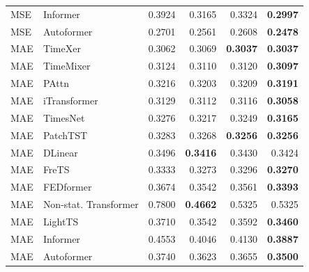\begin{longtable}{llrrrr}
MSE & Informer & 0.3924 & 0.3165 & 0.3324 & \textbf{0.2997} \\
MSE & Autoformer & 0.2701 & 0.2561 & 0.2608 & \textbf{0.2478} \\
\midrule
MAE & TimeXer & 0.3062 & 0.3069 & \textbf{0.3037} & \textbf{0.3037} \\
MAE & TimeMixer & 0.3124 & 0.3110 & 0.3120 & \textbf{0.3097} \\
MAE & PAttn & 0.3216 & 0.3203 & 0.3209 & \textbf{0.3191} \\
MAE & iTransformer & 0.3129 & 0.3112 & 0.3116 & \textbf{0.3058} \\
MAE & TimesNet & 0.3276 & 0.3217 & 0.3249 & \textbf{0.3165} \\
MAE & PatchTST & 0.3283 & 0.3268 & \textbf{0.3256} & \textbf{0.3256} \\
MAE & DLinear & 0.3496 & \textbf{0.3416} & 0.3430 & 0.3424 \\
MAE & FreTS & 0.3333 & 0.3273 & 0.3296 & \textbf{0.3270} \\
MAE & FEDformer & 0.3674 & 0.3542 & 0.3561 & \textbf{0.3393} \\
MAE & Non-stat. Transformer & 0.7800 & \textbf{0.4662} & 0.5325 & 0.5325 \\
MAE & LightTS & 0.3710 & 0.3542 & 0.3592 & \textbf{0.3460} \\
MAE & Informer & 0.4553 & 0.4046 & 0.4130 & \textbf{0.3887} \\
MAE & Autoformer & 0.3740 & 0.3623 & 0.3655 & \textbf{0.3500} \\
\end{longtable}
\endgroup

